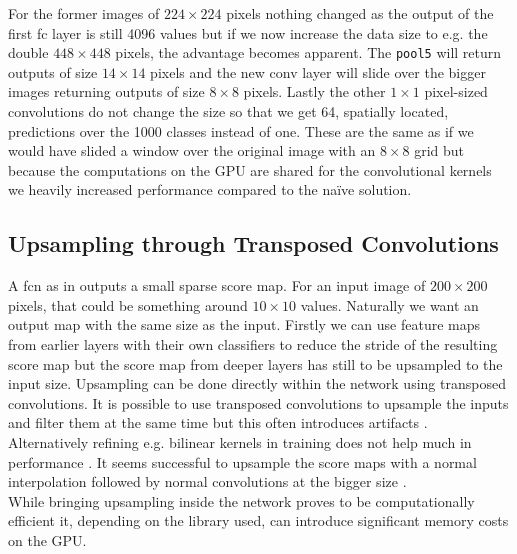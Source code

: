 For the former images of $224\times224$ pixels nothing changed as the output of the first \gls{fc} layer is still 4096 values but if we now increase the data size to e.g. the double $448\times448$ pixels, the advantage becomes apparent. The \texttt{pool5} will return outputs of size $14\times14$ pixels and the new \gls{conv} layer will slide over the bigger images returning outputs of size $8\times8$ pixels. Lastly the other $1\times1$ pixel-sized convolutions do not change the size so that we get 64, spatially located, predictions over the 1000 classes instead of one. These are the same as if we would have slided a window over the original image with an $8\times8$ grid but because the computations on the GPU are shared for the convolutional kernels we heavily increased performance compared to the naïve solution.

\subsection{Upsampling through Transposed Convolutions}
\label{sub:concepts:fcn:upsampling}
A \gls{fcn} as in \citep{long_fully_2015} outputs a small sparse score map. For an input image of $200\times 200$ pixels, that could be something around $10\times 10$ values. Naturally we want an output map with the same size as the input. Firstly we can use feature maps from earlier layers with their own classifiers to reduce the stride of the resulting score map but the score map from deeper layers has still to be upsampled to the input size. Upsampling can be done directly within the network using transposed convolutions. It is possible to use transposed convolutions to upsample the inputs and filter them at the same time but this often introduces artifacts \citep{odena_deconvolution_2016}. Alternatively refining e.g. bilinear kernels in training does not help much in performance \citep{shelhamer_fully_2016}. It seems successful to upsample the score maps with a normal interpolation followed by normal convolutions at the bigger size \citep{dong_image_2016}.\\
While bringing upsampling inside the network proves to be computationally efficient it, depending on the library used, can introduce significant memory costs on the GPU.

